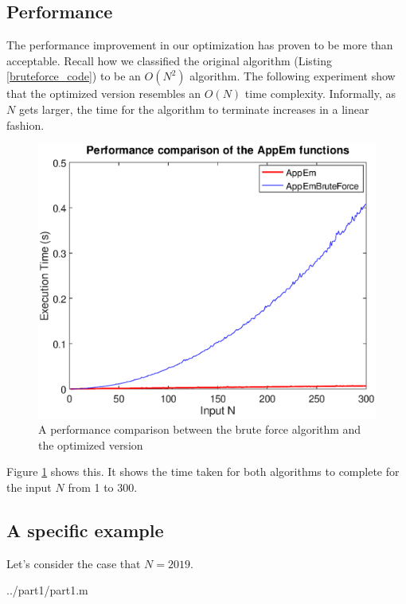 \documentclass[10pt]{article}
\begin{document}
\subsection{Performance}

The performance improvement in our optimization has proven to be more than acceptable. Recall how we classified the original algorithm (Listing \ref{bruteforce_code}) to be an $O(N^2)$ algorithm. The following experiment show that the optimized version resembles an $O(N)$ time complexity. Informally, as $N$ gets larger, the time for the algorithm to terminate increases in a linear fashion.

\begin{figure}[ht]

   \includegraphics[scale=0.6]{bruteforce_vs_better.eps}

   \caption{A performance comparison between the brute force algorithm and the optimized version}
      \label{fig:emnaive_vs_better}
\end{figure}


Figure \ref{fig:emnaive_vs_better} shows this. It shows the time taken for both algorithms to complete for the input $N$ from 1 to 300.


\subsection{A specific example}

Let's consider the case that $N = 2019$. 

   {../part1/part1.m}
  
\end{document}
